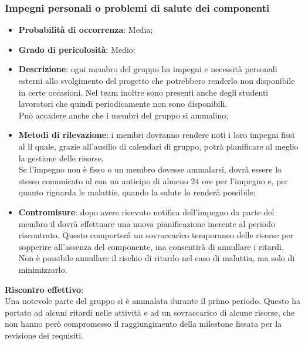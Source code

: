 		\subsubsection{Impegni personali o problemi di salute dei componenti} %
		\label{ssub:impegni_personali_dei_componenti}
			\begin{itemize}
				\item \textbf{Probabilità di occorrenza}: Media;
				\item \textbf{Grado di pericolosità}: Medio;
				\item \textbf{Descrizione}: ogni membro del gruppo ha impegni e necessità personali esterni allo svolgimento del progetto che potrebbero renderlo non disponibile in certe occasioni. Nel team inoltre sono presenti anche degli studenti lavoratori che quindi periodicamente non sono disponibili. \\
				Può accadere anche che i membri del gruppo si ammalino;
				\item \textbf{Metodi di rilevazione}: i membri dovranno rendere noti i loro impegni fissi al \roleProjectManager{} il quale, grazie all'ausilio di calendari di gruppo, potrà pianificare al meglio la gestione delle risorse. \\
				Se l'impegno non è fisso o un membro dovesse ammalarsi, dovrà essere lo stesso comunicato al \roleProjectManager{} con un anticipo di almeno 24 ore per l'impegno e, per quanto riguarda le malattie, quando la salute lo renderà possibile;
				\item \textbf{Contromisure}: dopo avere ricevuto notifica dell'impegno da parte del membro il \roleProjectManager{} dovrà effettuare una nuova pianificazione inerente al periodo riscontrato. Questo comporterà un sovraccarico temporaneo delle risorse per sopperire all'assenza del componente, ma consentirà di annullare i ritardi. \\
				Non è possibile annullare il rischio di ritardo nel caso di malattia, ma solo di minimizzarlo.
			\end{itemize}
		\noindent
		\textbf{Riscontro effettivo}: \\
		Una notevole parte del gruppo si è ammalata durante il primo periodo. Questo ha portato ad alcuni ritardi nelle attività e ad un sovraccarico di alcune risorse, che non hanno però compromesso il raggiungimento della milestone fissata per la revisione dei requisiti.
		

